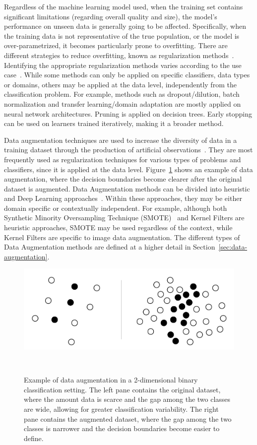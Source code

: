 \documentclass[parskip=full]{scrartcl}
\begin{document}
Regardless of the machine learning model used, when the training set contains
significant limitations (regarding overall quality and size), the model's
performance on unseen data is generally going to be affected. Specifically,
when the training data is not representative of the true population, or the
model is over-parametrized, it becomes particularly prone to overfitting.
There are different strategies to reduce overfitting, known as regularization
methods~\cite{Shorten2019}. Identifying the appropriate regularization methods
varies according to the use case~\cite{Chun2020}. While some methods can only
be applied on specific classifiers, data types or domains, others may be
applied at the data level, independently from the classification problem. For
example, methods such as dropout/dilution, batch normalization and transfer
learning/domain adaptation are mostly applied on neural network architectures.
Pruning is applied on decision trees. Early stopping can be used on learners
trained iteratively, making it a broader method. 

Data augmentation techniques are used to increase the diversity of data in a
training dataset through the production of artificial
observations~\cite{Wong2016}. They are most frequently used as regularization
techniques for various types of problems and classifiers, since it is applied
at the data level. Figure~\ref{fig:data_augmentation_example} shows an example
of data augmentation, where the decision boundaries become clearer after the
original dataset is augmented. Data Augmentation methods can be divided into
heuristic and Deep Learning approaches~\cite{Shorten2019, Ratner2017}. Within
these approaches, they may be either domain specific or contextually
independent. For example, although both Synthetic Minority Oversampling
Technique (SMOTE)~\cite{Chawla2002} and Kernel Filters are heuristic
approaches, SMOTE may be used regardless of the context, while Kernel Filters
are specific to image data augmentation. The different types of Data
Augmentation methods are defined at a higher detail in
Section~\ref{sec:data-augmentation}.

\begin{figure}[H]
	\centering
	\includegraphics[width=.75\linewidth]{../analysis/data_augmentation_example}
    \caption{Example of data augmentation in a 2-dimensional binary
        classification setting. The left pane contains the original dataset,
        where the amount data is scarce and the gap among the two classes are
        wide, allowing for greater classification variability. The right pane
        contains the augmented dataset, where the gap among the two classes is
        narrower and the decision boundaries become easier to define.
    }~\label{fig:data_augmentation_example}
\end{figure}
\end{document}
